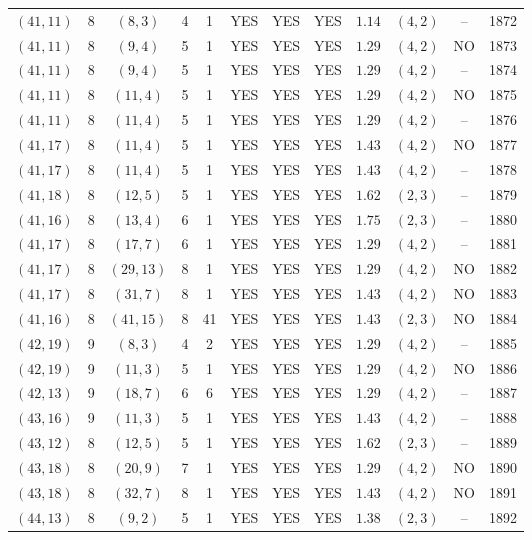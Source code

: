 \begin{longtable}{|c|c|c|c|c|c|c|c|c|c|c|c|}
$(41,11)$ & 8 & $(8,3)$ & 4 & 1 & YES & YES & YES & $1.14$ & $(4,2)$ & -- & 1872\\
$(41,11)$ & 8 & $(9,4)$ & 5 & 1 & YES & YES & YES & $1.29$ & $(4,2)$ & NO & 1873\\
$(41,11)$ & 8 & $(9,4)$ & 5 & 1 & YES & YES & YES & $1.29$ & $(4,2)$ & -- & 1874\\
$(41,11)$ & 8 & $(11,4)$ & 5 & 1 & YES & YES & YES & $1.29$ & $(4,2)$ & NO & 1875\\
$(41,11)$ & 8 & $(11,4)$ & 5 & 1 & YES & YES & YES & $1.29$ & $(4,2)$ & -- & 1876\\
$(41,17)$ & 8 & $(11,4)$ & 5 & 1 & YES & YES & YES & $1.43$ & $(4,2)$ & NO & 1877\\
$(41,17)$ & 8 & $(11,4)$ & 5 & 1 & YES & YES & YES & $1.43$ & $(4,2)$ & -- & 1878\\
$(41,18)$ & 8 & $(12,5)$ & 5 & 1 & YES & YES & YES & $1.62$ & $(2,3)$ & -- & 1879\\
$(41,16)$ & 8 & $(13,4)$ & 6 & 1 & YES & YES & YES & $1.75$ & $(2,3)$ & -- & 1880\\
$(41,17)$ & 8 & $(17,7)$ & 6 & 1 & YES & YES & YES & $1.29$ & $(4,2)$ & -- & 1881\\
$(41,17)$ & 8 & $(29,13)$ & 8 & 1 & YES & YES & YES & $1.29$ & $(4,2)$ & NO & 1882\\
$(41,17)$ & 8 & $(31,7)$ & 8 & 1 & YES & YES & YES & $1.43$ & $(4,2)$ & NO & 1883\\
$(41,16)$ & 8 & $(41,15)$ & 8 & 41 & YES & YES & YES & $1.43$ & $(2,3)$ & NO & 1884\\
$(42,19)$ & 9 & $(8,3)$ & 4 & 2 & YES & YES & YES & $1.29$ & $(4,2)$ & -- & 1885\\
$(42,19)$ & 9 & $(11,3)$ & 5 & 1 & YES & YES & YES & $1.29$ & $(4,2)$ & NO & 1886\\
$(42,13)$ & 9 & $(18,7)$ & 6 & 6 & YES & YES & YES & $1.29$ & $(4,2)$ & -- & 1887\\
$(43,16)$ & 9 & $(11,3)$ & 5 & 1 & YES & YES & YES & $1.43$ & $(4,2)$ & -- & 1888\\
$(43,12)$ & 8 & $(12,5)$ & 5 & 1 & YES & YES & YES & $1.62$ & $(2,3)$ & -- & 1889\\
$(43,18)$ & 8 & $(20,9)$ & 7 & 1 & YES & YES & YES & $1.29$ & $(4,2)$ & NO & 1890\\
$(43,18)$ & 8 & $(32,7)$ & 8 & 1 & YES & YES & YES & $1.43$ & $(4,2)$ & NO & 1891\\
$(44,13)$ & 8 & $(9,2)$ & 5 & 1 & YES & YES & YES & $1.38$ & $(2,3)$ & -- & 1892\\

\end{longtable}
